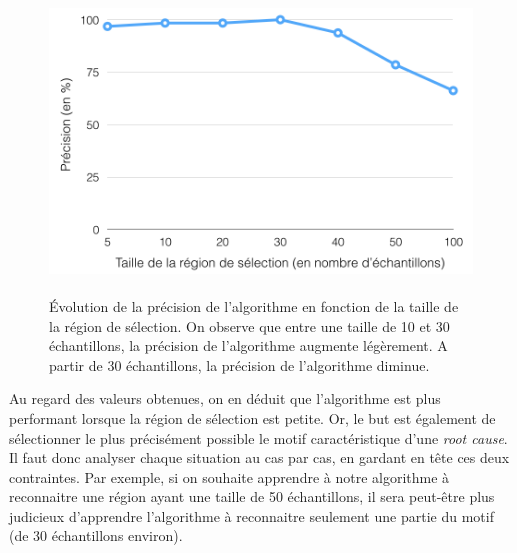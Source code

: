 \begin{figure}[h]
	\centering\includegraphics[height=8cm]{images/precision_taille.png}
	\caption[Evolution de la précision de l'algorithme en fonction de la taille de la région de sélection]{Évolution de la précision de l'algorithme en fonction de la taille de la région de sélection.  On observe que entre une taille de 10 et 30 échantillons, la précision de l'algorithme augmente légèrement. A partir de 30 échantillons, la précision de l'algorithme diminue.}
	\label{fig: Evolution de la précision de l'algorithme en fonction de la taille de la région de sélection}
\end{figure} 

Au regard des valeurs obtenues, on en déduit que l'algorithme est plus performant lorsque la région de sélection est petite. Or, le but est également de sélectionner le plus précisément possible le motif caractéristique d'une \emph{root cause}. Il faut donc analyser chaque situation au cas par cas,  en gardant en tête ces deux contraintes. Par exemple, si on souhaite apprendre à notre algorithme à reconnaitre une région ayant une taille de 50 échantillons, il sera peut-être plus judicieux d'apprendre l'algorithme à reconnaitre seulement une partie du motif (de 30 échantillons environ).